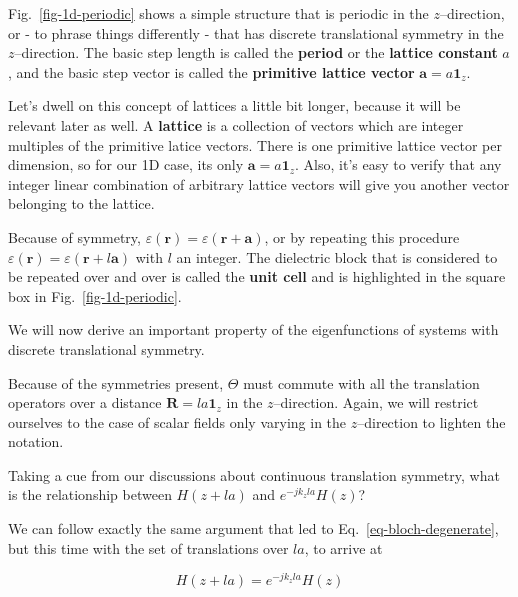 Fig.~\ref{fig-1d-periodic} shows a simple structure that is periodic in the $z$--direction, or - to phrase things differently - that has discrete translational symmetry in the $z$--direction. The basic step length is called the \textbf{period} or the \textbf{lattice constant} $a$, and the basic step vector is called the \textbf{primitive lattice vector} ${\mathbf a} = a {\mathbf 1}_z$.

Let's dwell on this concept of lattices a little bit longer, because it will be relevant later as well. A \textbf{lattice} is a collection of vectors which are integer multiples of the primitive latice vectors. There is one primitive lattice vector per dimension, so for our 1D case, its only  ${\mathbf a} = a {\mathbf 1}_z$. Also, it's easy to verify that any integer linear combination of arbitrary lattice vectors will give you another vector belonging to the lattice.

Because of symmetry, $\varepsilon({\mathbf r}) =  \varepsilon({\mathbf r} + {\mathbf a})$, or by repeating this procedure $\varepsilon({\mathbf r}) =  \varepsilon({\mathbf r} + l {\mathbf a})$ with $l$ an integer. The dielectric block that is considered to be repeated over and over is called the \textbf{unit cell} and is highlighted in the square box in Fig.~\ref{fig-1d-periodic}. 


We will now derive an important property of the eigenfunctions of systems with discrete translational symmetry.

Because of the symmetries present, $\Theta$ must commute with all the translation operators over a distance ${\mathbf R} = l a {\mathbf 1}_z$ in the $z$--direction. Again, we will restrict ourselves to the case of scalar fields only varying in the $z$--direction to lighten the notation.

\begin{cue}
Taking a cue from our discussions about continuous translation symmetry, what is the relationship between $H(z + la)$ and $e^{-j k_z la} H(z)$?
\end{cue}

We can follow exactly the same argument that led to Eq.~\ref{eq-bloch-degenerate}, but this time with the set of translations over $la$, to arrive at

\begin{equation}
H(z + la) = e^{-j k_z la} H(z)
\end{equation} 

\pagebreak


